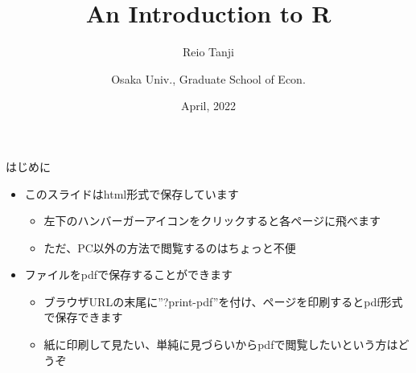 \documentclass[
  ignorenonframetext,
]{beamer}
\title{An Introduction to R}
\author{Reio Tanji \and Osaka Univ., Graduate School of Econ.}
\date{April, 2022}
\providecommand{\tightlist}{%
  \setlength{\itemsep}{0pt}\setlength{\parskip}{0pt}}
\begin{document}
\frame{\titlepage}

\begin{frame}{はじめに}
\protect\hypertarget{ux306fux3058ux3081ux306b}{}
\begin{itemize}
\tightlist
\item
  このスライドはhtml形式で保存しています

  \begin{itemize}
  \tightlist
  \item
    左下のハンバーガーアイコンをクリックすると各ページに飛べます
  \item
    ただ、PC以外の方法で閲覧するのはちょっと不便
  \end{itemize}
\item
  ファイルをpdfで保存することができます

  \begin{itemize}
  \tightlist
  \item
    ブラウザURLの末尾に''?print-pdf''を付け、ページを印刷するとpdf形式で保存できます
  \item
    紙に印刷して見たい、単純に見づらいからpdfで閲覧したいという方はどうぞ
  \end{itemize}
\end{itemize}
\end{frame}
\end{document}
